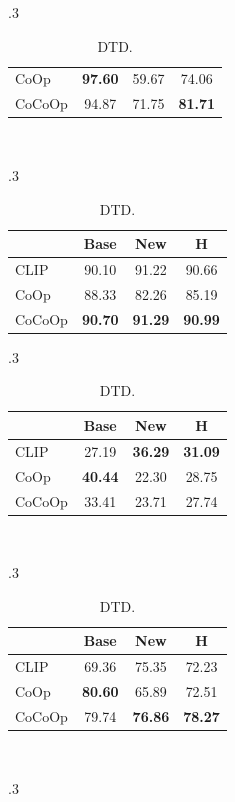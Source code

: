 \documentclass[10pt,twocolumn,letterpaper]{article}
\begin{document}
\begin{table}[t]
\begin{subtable}[t]{.3\textwidth}
\begin{tabular}{l cc|c}
    CoOp & \textbf{97.60} & 59.67 & 74.06 \\
    \rowcolor{tabhighlight}
    CoCoOp & 94.87 & 71.75 & \textbf{81.71} \\
    \bottomrule
    \end{tabular}
    \end{subtable}
    ~
    \begin{subtable}[t]{.3\textwidth}
    \centering
    \caption{Food101.}
    \begin{tabular}{l cc|c}
    \toprule
    & Base & New & H \\
    \midrule
    CLIP & 90.10 & 91.22 & 90.66 \\
    CoOp & 88.33 & 82.26 & 85.19 \\
    \rowcolor{tabhighlight}
    CoCoOp & \textbf{90.70} & \textbf{91.29} & \textbf{90.99} \\
    \bottomrule
    \end{tabular}
    \end{subtable}
    \vspace{1em}
    \begin{subtable}[t]{.3\textwidth}
    \centering
    \caption{FGVCAircraft.}
    \begin{tabular}{l cc|c}
    \toprule
    & Base & New & H \\
    \midrule
    CLIP & 27.19 & \textbf{36.29} & \textbf{31.09} \\
    CoOp & \textbf{40.44} & 22.30 & 28.75 \\
    \rowcolor{tabhighlight}
    CoCoOp & 33.41 & 23.71 & 27.74 \\
    \bottomrule
    \end{tabular}
    \end{subtable}
    ~
    \begin{subtable}[t]{.3\textwidth}
    \centering
    \caption{SUN397.}
    \begin{tabular}{l cc|c}
    \toprule
    & Base & New & H \\
    \midrule
    CLIP & 69.36 & 75.35 & 72.23 \\
    CoOp & \textbf{80.60} & 65.89 & 72.51 \\
    \rowcolor{tabhighlight}
    CoCoOp & 79.74 & \textbf{76.86} & \textbf{78.27} \\
    \bottomrule
    \end{tabular}
    \end{subtable}
    ~
    \begin{subtable}[t]{.3\textwidth}
    \centering
    \caption{DTD.}

\end{subtable}
\end{table}
\end{document}
